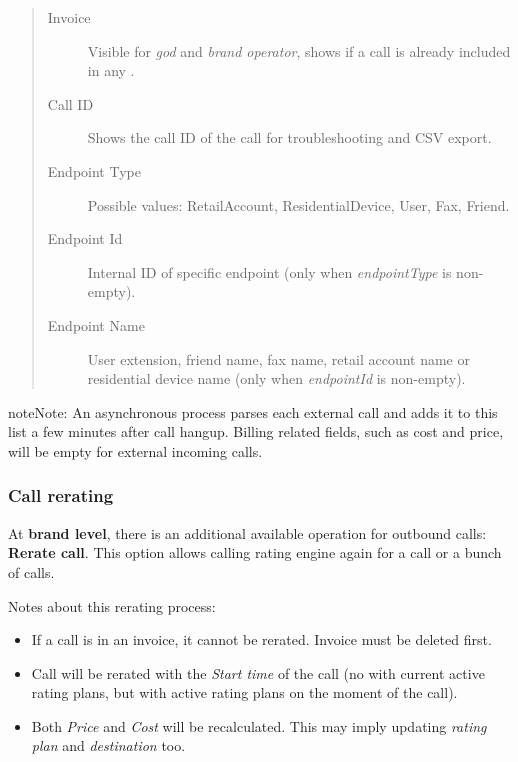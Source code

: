 \documentclass[letterpaper,10pt,english]{sphinxmanual}
\begin{document}
\begin{quote}
\begin{description}
\item[{Invoice}] \leavevmode
Visible for \emph{god} and \emph{brand operator}, shows if a call is already included in any {\hyperref[administration_portal/brand/invoicing/invoices:invoices]{}}.

\item[{Call ID}] \leavevmode
Shows the call ID of the call for troubleshooting and CSV export.

\item[{Endpoint Type}] \leavevmode
Possible values: RetailAccount, ResidentialDevice, User, Fax, Friend.

\item[{Endpoint Id}] \leavevmode
Internal ID of specific endpoint (only when \emph{endpointType} is non-empty).

\item[{Endpoint Name}] \leavevmode
User extension, friend name, fax name, retail account name or residential device name (only when \emph{endpointId} is non-empty).

\end{description}
\end{quote}

\begin{notice}{note}{Note:}
An asynchronous process parses each external call and adds it to this list a few minutes after call hangup. Billing related fields, such as cost and price, will be empty for external incoming calls.
\end{notice}


\subsubsection{Call rerating}
\label{administration_portal/brand/calls/external_calls:call-rerating}
At \textbf{brand level}, there is an additional available operation for outbound calls: \textbf{Rerate call}. This option allows calling rating engine again for a call or a bunch of calls.

Notes about this rerating process:
\begin{itemize}
\item {} 
If a call is in an invoice, it cannot be rerated. Invoice must be deleted first.

\item {} 
Call will be rerated with the \emph{Start time} of the call (no with current active rating plans, but with active rating plans
on the moment of the call).

\item {} 
Both \emph{Price} and \emph{Cost} will be recalculated. This may imply updating \emph{rating plan} and \emph{destination} too.

\end{itemize}
\end{document}
